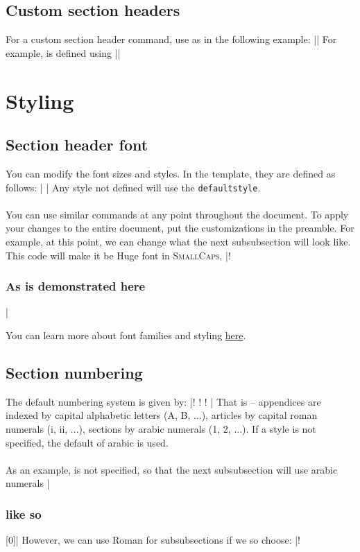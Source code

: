 \documentclass{constitution}
\begin{document}
\subsection{Custom section headers}
For a custom section header command, use \cmdex{\makesectioning} as in the following example:
\codeex||
For example, \cmdex{\section} is defined using
\codeex||

\section{Styling}
\subsection{Section header font}
You can modify the font sizes and styles.
In the template, they are defined as follows:
\codeex|\def\appendixstyle{\normalfont\Large\bfseries\scshape}
\def\articlestyle{\normalfont\Large\bfseries\scshape\underline}
\def\sectionstyle{\normalfont\large\bfseries\scshape}
\def\defaultstyle{\normalfont\normalsize\bfseries\scshape}|
Any style not defined will use the \verb|defaultstyle|.
\\\\
You can use similar commands at any point throughout the document.
To apply your changes to the entire document, put the customizations in the preamble.
For example, at this point, we can change what the next subsubsection will look like.
This code will make it be {\Huge Huge} font in \textsc{SmallCaps}.
\coderunex|\def\subsubsectionstyle{\normalfont\Huge\scshape}!
\subsubsection{As is demonstrated here}|

You can learn more about font families and styling \href{https://www.overleaf.com/learn/latex/Font_sizes%2C_families%2C_and_styles}{here}.

\subsection{Section numbering}
The default numbering system is given by:
\codeex|\let\appendixnumstyle\Alph!
\let\articlenumstyle\Roman!
\let\sectionnumstyle\arabic!
\let\defaultnumstyle\arabic|
That is -- appendices are indexed by capital alphabetic letters (A, B, ...), articles by capital roman numerals (i, ii, ...), sections by arabic numerals (1, 2, ...).
If a style is not specified, the default of arabic is used.
\\\\
As an example, \cmdex{\subsubsectionnumstyle} is not specified, so that the next subsubsection will use arabic numerals
\coderunex|\subsubsection{like so}[0]|
However, we can use Roman for subsubsections if we so choose:
\coderunex|\let\subsubsectionnumstyle\Roman!
\end{document}
